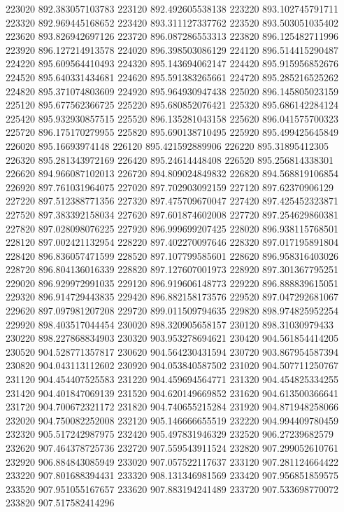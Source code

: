 {223020 892.383057103783
223120 892.492605538138
223220 893.102745791711
223320 892.969445168652
223420 893.311127337762
223520 893.503051035402
223620 893.826942697126
223720 896.087286553313
223820 896.125482711996
223920 896.127214913578
224020 896.398503086129
224120 896.514415290487
224220 895.609564410493
224320 895.143694062147
224420 895.915956852676
224520 895.640331434681
224620 895.591383265661
224720 895.285216525262
224820 895.371074803609
224920 895.964930947438
225020 896.145805023159
225120 895.677562366725
225220 895.680852076421
225320 895.686142284124
225420 895.932930857515
225520 896.135281043158
225620 896.041575700323
225720 896.175170279955
225820 895.690138710495
225920 895.499425645849
226020 895.16693974148
226120 895.421592889906
226220 895.31895412305
226320 895.281343972169
226420 895.24614448408
226520 895.256814338301
226620 894.966087102013
226720 894.809024849832
226820 894.568819106854
226920 897.761031964075
227020 897.702903092159
227120 897.62370906129
227220 897.512388771356
227320 897.475709670047
227420 897.425452323871
227520 897.383392158034
227620 897.601874602008
227720 897.254629860381
227820 897.028098076225
227920 896.999699207425
228020 896.938115768501
228120 897.002421132954
228220 897.402270097646
228320 897.017195891804
228420 896.836057471599
228520 897.107799585601
228620 896.958316403026
228720 896.804136016339
228820 897.127607001973
228920 897.301367795251
229020 896.929972991035
229120 896.919606148773
229220 896.888839615051
229320 896.914729443835
229420 896.882158173576
229520 897.047292681067
229620 897.097981207208
229720 899.011509794635
229820 898.974825952254
229920 898.403517044454
230020 898.320905658157
230120 898.31030979433
230220 898.227868834903
230320 903.953278694621
230420 904.561854414205
230520 904.528771357817
230620 904.564230431594
230720 903.867954587394
230820 904.043113112602
230920 904.053840587502
231020 904.507711250767
231120 904.454407525583
231220 904.459694564771
231320 904.454825334255
231420 904.401847069139
231520 904.620149669852
231620 904.613500366641
231720 904.700672321172
231820 904.740655215284
231920 904.871948258066
232020 904.750082252008
232120 905.146666655519
232220 904.994409780459
232320 905.517242987975
232420 905.497831946329
232520 906.27239682579
232620 907.464378725736
232720 907.559543911524
232820 907.299052610761
232920 906.884843085949
233020 907.057522117637
233120 907.281124664422
233220 907.801688394431
233320 908.131346981569
233420 907.956851859575
233520 907.951055167657
233620 907.883194241489
233720 907.533698770072
233820 907.517582414296
}
